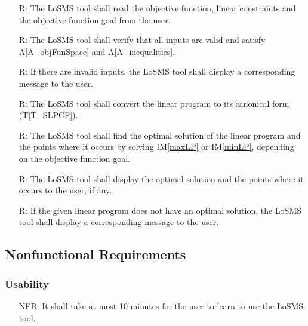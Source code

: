 \documentclass[12pt]{article}
\newcommand{\tref}[1]{T\ref{#1}}
\newcommand{\aref}[1]{A\ref{#1}}
\newcommand{\iref}[1]{IM\ref{#1}}
\newcounter{reqnum} %
\newcounter{nfreqnum} %
\newcommand{\famname}{LoSMS} %
\begin{document}
\noindent 
\begin{itemize}
	\item[R\refstepcounter{reqnum}\thereqnum \label{R_Inputs}:] The \famname{} 
	tool shall read the objective function, linear constraints and the 
	objective function goal from the user.
	
	\item[R\refstepcounter{reqnum}\thereqnum \label{R_HandleInputErrors}:] The 
	\famname{} tool shall verify that all inputs are valid and satisfy 
	\aref{A_objFunSpace} and \aref{A_inequalities}.
	
	\item[R\refstepcounter{reqnum}\thereqnum \label{R_DisplayErrorMsg}:] If 
	there are invalid inputs, the \famname{} tool shall display a corresponding 
	message to the user.
	
	\item[R\refstepcounter{reqnum}\thereqnum \label{R_CanonicalForm}:] The 
	\famname{} tool shall convert the linear program to its canonical form 
	(\tref{T_SLPCF}).

	\item[R\refstepcounter{reqnum}\thereqnum \label{R_Calculate}:] The 
	\famname{} tool shall find the optimal solution of the linear program and 
	the points where it occurs by solving \iref{maxLP} or \iref{minLP}, 
	depending on the objective function goal.
	
	\item[R\refstepcounter{reqnum}\thereqnum \label{R_Output}:] The \famname{} 
	tool shall display the optimal solution and the points where it occurs to 
	the user, if any.
	
	\item[R\refstepcounter{reqnum}\thereqnum \label{R_OutputError}:] If the 
	given linear program does not have an optimal solution, the \famname{} 
	tool shall display a corresponding message to the user.
\end{itemize}

\subsection{Nonfunctional Requirements}

\subsubsection*{Usability}

\noindent 
\begin{itemize}
	\item[NFR\refstepcounter{nfreqnum}\thenfreqnum \label{NFR_usability}:] It 
	shall 
	take at most 10 minutes for the user to learn to use the \famname{} tool.
\end{itemize}
\end{document}
